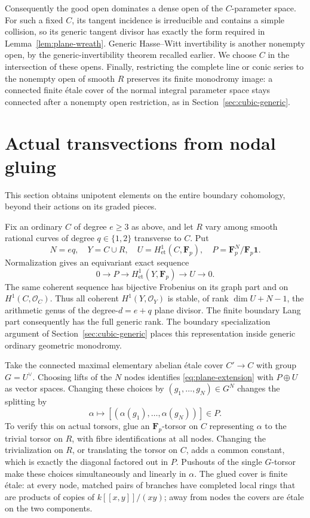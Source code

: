 \documentclass[11pt]{article}
\begin{document}
Consequently the good open dominates a dense open of the $C$-parameter space. For such a fixed $C$, its tangent incidence is irreducible and contains a simple collision, so its generic tangent divisor has exactly the form required in Lemma~\ref{lem:plane-wreath}. Generic Hasse--Witt invertibility is another nonempty open, by the generic-invertibility theorem recalled earlier. We choose $C$ in the intersection of these opens. Finally, restricting the complete line or conic series to the nonempty open of smooth $R$ preserves its finite monodromy image: a connected finite \'etale cover of the normal integral parameter space stays connected after a nonempty open restriction, as in Section~\ref{sec:cubic-generic}.

\section{Actual transvections from nodal gluing}\label{sec:plane-transvections}
This section obtains unipotent elements on the entire boundary cohomology, beyond their actions on its graded pieces.

Fix an ordinary $C$ of degree $e\ge3$ as above, and let $R$ vary among smooth rational curves of degree $q\in\{1,2\}$ transverse to $C$. Put
\[
 N=eq,\quad Y=C\cup R,\quad U=H^1_{\mathrm{et}}(C,\mathbf F_p),
 \quad P=\mathbf F_p^N/\mathbf F_p\mathbf1.
\]
Normalization gives an equivariant exact sequence
\begin{equation}\label{eq:plane-extension}
 0\longrightarrow P\longrightarrow H^1_{\mathrm{et}}(Y,\mathbf F_p)
                   \longrightarrow U\longrightarrow0.
\end{equation}
The same coherent sequence has bijective Frobenius on its graph part and on $H^1(C,\mathcal O_C)$. Thus all coherent $H^1(Y,\mathcal O_Y)$ is stable, of rank $\dim U+N-1$, the arithmetic genus of the degree-$d=e+q$ plane divisor. The finite boundary Lang part consequently has the full generic rank. The boundary specialization argument of Section~\ref{sec:cubic-generic} places this representation inside generic ordinary geometric monodromy.

Take the connected maximal elementary abelian \'etale cover $C'\to C$ with group $G=U^\vee$. Choosing lifts of the $N$ nodes identifies \eqref{eq:plane-extension} with $P\oplus U$ as vector spaces. Changing these choices by $(g_1,\ldots,g_N)\in G^N$ changes the splitting by
\begin{equation}\label{eq:plane-gluing-translation}
 \alpha\longmapsto[(\alpha(g_1),\ldots,\alpha(g_N))]\in P.
\end{equation}
To verify this on actual torsors, glue an $\mathbf F_p$-torsor on $C$ representing $\alpha$ to the trivial torsor on $R$, with fibre identifications at all nodes. Changing the trivialization on $R$, or translating the torsor on $C$, adds a common constant, which is exactly the diagonal factored out in $P$. Pushouts of the single $G$-torsor make these choices simultaneously and linearly in $\alpha$. The glued cover is finite \'etale: at every node, matched pairs of branches have completed local rings that are products of copies of $k[[x,y]]/(xy)$; away from nodes the covers are \'etale on the two components.
\end{document}

